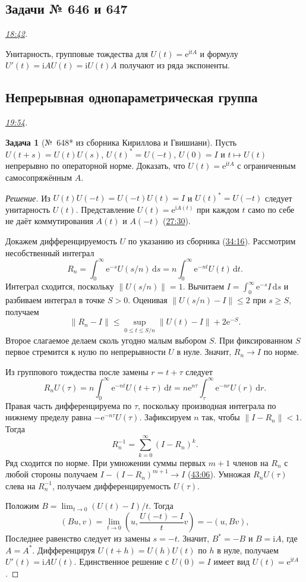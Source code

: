 \documentclass[11pt,a4paper]{article}
\theoremstyle{plain}
\theoremstyle{definition}
\newtheorem{exercise}[theorem]{Задача}
\newcommand{\id}{I}
\newcommand{\dd}{\,\mathrm d}
\newcommand{\ii}{\mathrm i}
\newcommand{\ee}{\mathrm e}
\newcommand{\norm}[1]{\lVert#1\rVert}
\newcommand{\at}[3]{\href{https://www.youtube.com/watch?v=#1&t=#2s}{#3}}
\newcommand{\topic}[2]{\Needspace{5\baselineskip}\subsection*{#1}\noindent\emph{#2.}\par\nobreak\smallskip}
\begin{document}
\topic{Задачи № 646 и 647}{\at{uLlyRG0VRnY}{1122}{18:42}}
Унитарность, групповые тождества для $U(t)=\ee^{\ii tA}$ и формулу
$U'(t)=\ii AU(t)=\ii U(t)A$ получают из ряда экспоненты.

\topic{Непрерывная однопараметрическая группа}{\at{uLlyRG0VRnY}{1194}{19:54}}
\begin{exercise}[№~648* из сборника Кириллова и Гвишиани]
Пусть $U(t+s)=U(t)U(s)$, $U(t)^*=U(-t)$, $U(0)=\id$
и $t\mapsto U(t)$ непрерывно по операторной норме.
Доказать, что $U(t)=\ee^{\ii tA}$ с ограниченным
самосопряжённым $A$.
\end{exercise}
\begin{proof}[Решение]
Из $U(t)U(-t)=U(-t)U(t)=\id$ и $U(t)^*=U(-t)$ следует
унитарность $U(t)$. Представление $U(t)=\ee^{\ii A(t)}$ при
каждом $t$ само по себе не даёт коммутирования $A(t)$ и $A(-t)$
(\at{uLlyRG0VRnY}{1650}{27:30}).

Докажем дифференцируемость $U$ по указанию из сборника
(\at{uLlyRG0VRnY}{2056}{34:16}). Рассмотрим несобственный интеграл
\[
 R_n=\int_0^\infty\ee^{-s}U(s/n)\dd s
    =n\int_0^\infty\ee^{-nt}U(t)\dd t .
\]
Интеграл сходится, поскольку $\norm{U(s/n)}=1$. Вычитаем
$\id=\int_0^\infty\ee^{-s}\id\dd s$ и разбиваем интеграл в точке
$S>0$. Оценивая $\norm{U(s/n)-\id}\le2$ при $s\ge S$, получаем
\[
 \norm{R_n-\id}
 \le \sup_{0\le t\le S/n}\norm{U(t)-\id}+2\ee^{-S}.
\]
Второе слагаемое делаем сколь угодно малым выбором $S$.
При фиксированном $S$ первое стремится к нулю по непрерывности
$U$ в нуле. Значит, $R_n\to\id$ по норме.

Из группового тождества после замены $r=t+\tau$ следует
\[
 R_n U(\tau)=n\int_0^\infty\ee^{-nt}U(t+\tau)\dd t
            =n\ee^{n\tau}\int_\tau^\infty\ee^{-nr}U(r)\dd r .
\]
Правая часть дифференцируема по $\tau$, поскольку производная
интеграла по нижнему пределу равна $-\ee^{-n\tau}U(\tau)$.
Зафиксируем $n$ так, чтобы $\norm{\id-R_n}<1$. Тогда
\[
 R_n^{-1}=\sum_{k=0}^{\infty}(\id-R_n)^k.
\]
Ряд сходится по норме. При умножении суммы первых $m+1$ членов
на $R_n$ с любой стороны получаем $\id-(\id-R_n)^{m+1}\to\id$
(\at{uLlyRG0VRnY}{2586}{43:06}).
Умножая $R_nU(\tau)$ слева на $R_n^{-1}$, получаем
дифференцируемость $U(\tau)$.

Положим $B=\lim_{t\to0}(U(t)-\id)/t$. Тогда
\[
 (Bu,v)=\lim_{t\to0}\left(u,\frac{U(-t)-\id}{t}v\right)
       =-(u,Bv),
\]
Последнее равенство следует из замены $s=-t$. Значит,
$B^*=-B$ и $B=\ii A$, где $A=A^*$. Дифференцируя
$U(t+h)=U(h)U(t)$ по $h$ в нуле, получаем $U'(t)=\ii AU(t)$.
Единственное решение с $U(0)=\id$ имеет вид $U(t)=\ee^{\ii tA}$.
\end{proof}
\end{document}

